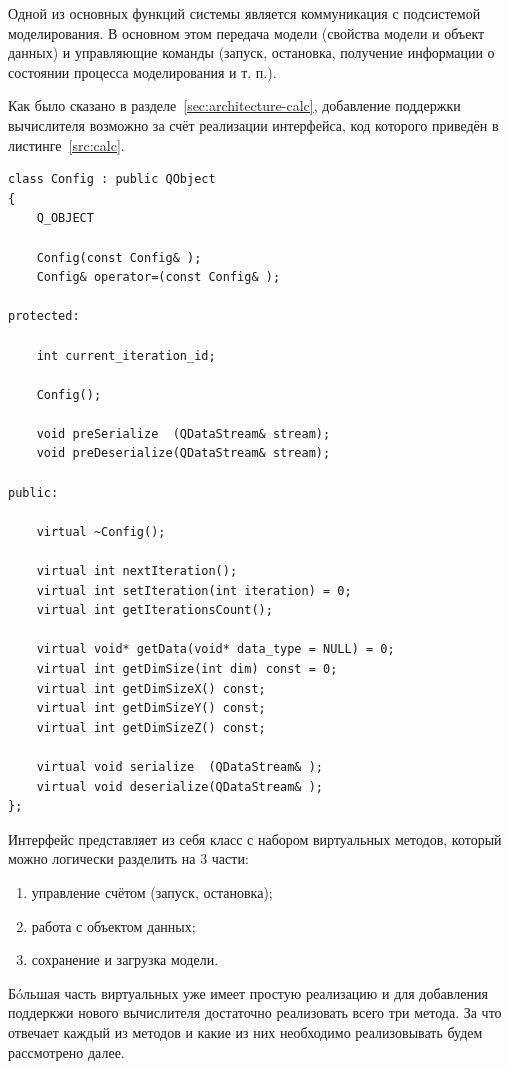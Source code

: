 \documentclass[a4paper,12pt]{extarticle}
\begin{document}
Одной из основных функций системы является коммуникация с подсистемой моделирования. В основном этом передача модели (свойства модели и объект данных) и управляющие команды (запуск, остановка, получение информации о состоянии процесса моделирования и т. п.).

Как было сказано в разделе~\ref{sec:architecture-calc}, добавление поддержки вычислителя возможно за счёт реализации интерфейса, код которого приведён в листинге~\ref{src:calc}.

\begin{lstlisting}[label=src:calc,caption=Интерфейс подключения вычислителя]
class Config : public QObject
{
    Q_OBJECT

    Config(const Config& );
    Config& operator=(const Config& );

protected:

    int current_iteration_id;

    Config();

    void preSerialize  (QDataStream& stream);
    void preDeserialize(QDataStream& stream);

public:

    virtual ~Config();

    virtual int nextIteration();
    virtual int setIteration(int iteration) = 0;
    virtual int getIterationsCount();

    virtual void* getData(void* data_type = NULL) = 0;
    virtual int getDimSize(int dim) const = 0;
    virtual int getDimSizeX() const;
    virtual int getDimSizeY() const;
    virtual int getDimSizeZ() const;

    virtual void serialize  (QDataStream& );
    virtual void deserialize(QDataStream& );
};
\end{lstlisting}

Интерфейс представляет из себя класс с набором виртуальных методов, который можно логически разделить на 3 части:
\begin{enumerate}
    \item управление счётом (запуск, остановка);
    \item работа с объектом данных;
    \item сохранение и загрузка модели.
\end{enumerate}

Б\'oльшая часть виртуальных уже имеет простую реализацию и для добавления поддеркжи нового вычислителя достаточно реализовать всего три метода. За что отвечает каждый из методов и какие из них необходимо реализовывать будем рассмотрено далее.
\end{document}
